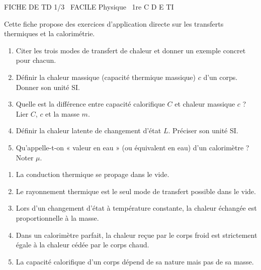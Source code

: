 \documentclass[11pt]{article}
\begin{document}
\begin{tcolorbox}[enhanced,colback=popink,colframe=popink,arc=10pt,boxrule=0pt,left=12pt,right=12pt,top=9pt,bottom=9pt]
{\color{white}\popxbold\small FICHE DE TD 1/3 \textbullet\ FACILE \hfill Physique \textbullet\ 1re C D E TI\par}
\end{tcolorbox}
\vspace{4pt}
Cette fiche propose des exercices d'application directe sur les transferts thermiques et la calorimétrie.

\begin{exercice}
\begin{enumerate}
    \item Citer les trois modes de transfert de chaleur et donner un exemple concret pour chacun.
    \item Définir la chaleur massique (capacité thermique massique) $c$ d'un corps. Donner son unité SI.
    \item Quelle est la différence entre capacité calorifique $C$ et chaleur massique $c$ ? Lier $C$, $c$ et la masse $m$.
    \item Définir la chaleur latente de changement d'état $L$. Préciser son unité SI.
    \item Qu'appelle-t-on « valeur en eau » (ou équivalent en eau) d'un calorimètre ? Noter $\mu$.
\end{enumerate}
\end{exercice}

\begin{exercice}
\begin{enumerate}
    \item La conduction thermique se propage dans le vide.
    \item Le rayonnement thermique est le seul mode de transfert possible dans le vide.
    \item Lors d'un changement d'état à température constante, la chaleur échangée est proportionnelle à la masse.
    \item Dans un calorimètre parfait, la chaleur reçue par le corps froid est strictement égale à la chaleur cédée par le corps chaud.
    \item La capacité calorifique d'un corps dépend de sa nature mais pas de sa masse.
\end{enumerate}
\end{exercice}
\end{document}
